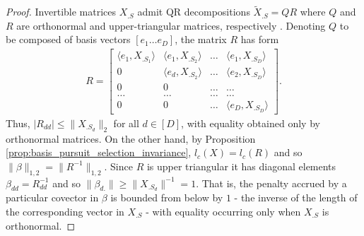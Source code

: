 \begin{proof}







Invertible matrices $X_{.S}$ admit QR decompositions $\tilde X_{.S} = QR$ where $Q$ and $R$ are orthonormal and upper-triangular matrices, respectively \citep{Anderson1992-fb}.
Denoting $Q$ to be composed of basis vectors $[e_1 \dots e_D]$, the matrix $R$ has form
\begin{align}
R = \begin{bmatrix}
\langle e_1, X_{.S_1} \rangle & \langle e_1,  X_{.S_2} \rangle  &\dots &  \langle e_1,  X_{.S_D} \rangle \\
0 & \langle e_d,  X_{.S_2} \rangle & \dots  &  \langle e_2,  X_{.S_D} \rangle\\
0 & 0 & \dots & \dots  \\
\dots & \dots & \dots & \dots \\
0 & 0 & \dots & \langle e_D, X_{.S_D} \rangle 
\end{bmatrix}.
\end{align}
Thus, $|R_{dd} | \leq \|X_{.{S_{d}}}\|_2$ for all $d \in [D]$, with equality obtained only by orthonormal matrices.
On the other hand, by Proposition \ref{prop:basis_pursuit_selection_invariance}, $l_c(X) = l_c(R)$ and so $\|\beta\|_{1,2} = \|R^{-1}\|_{1,2}$.
Since $R$ is upper triangular it has diagonal elements $\beta_{dd} = R_{dd}^{-1}$ and so $\|\beta_{d.}\| \geq \| X_{.{S_d}}\|^{-1} = 1$.
That is, the penalty accrued by a particular covector in $\beta$ is bounded from below by $1$ - the inverse of the length of the corresponding vector in $X_{.S}$ - with equality occurring only when $X_{.S}$ is orthonormal.
\end{proof}

